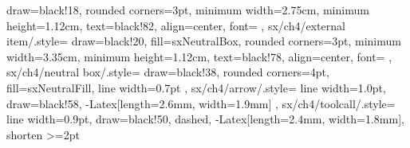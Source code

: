 {{    draw=black!18,
    rounded corners=3pt,
    minimum width=2.75cm,
    minimum height=1.12cm,
    text=black!82,
    align=center,
    font=\sffamily\footnotesize
  },
  sx/ch4/external item/.style={
    draw=black!20,
    fill=sxNeutralBox,
    rounded corners=3pt,
    minimum width=3.35cm,
    minimum height=1.12cm,
    text=black!78,
    align=center,
    font=\sffamily\footnotesize
  },
  sx/ch4/neutral box/.style={
    draw=black!38,
    rounded corners=4pt,
    fill=sxNeutralFill,
    line width=0.7pt
  },
  sx/ch4/arrow/.style={
    line width=1.0pt,
    draw=black!58,
    -{Latex[length=2.6mm, width=1.9mm]}
  },
  sx/ch4/toolcall/.style={
    line width=0.9pt,
    draw=black!50,
    dashed,
    -{Latex[length=2.4mm, width=1.8mm]},
    shorten >=2pt
  }
}

\newcommand{\sxPanelTitle}[3]{%
  \node[sx/panel title, minimum width=#3] at #1 {#2};%
}

\newcommand{\sxComponent}[3]{%
  \node[sx/component] (#1) at #2 {#3};%
}

\newcommand{\sxPort}[3]{%
  \node[sx/port] (#1) at #2 {#3};%
}

\newcommand{\sxdataheading}[1]{%
  \textbf{#1}%
}
